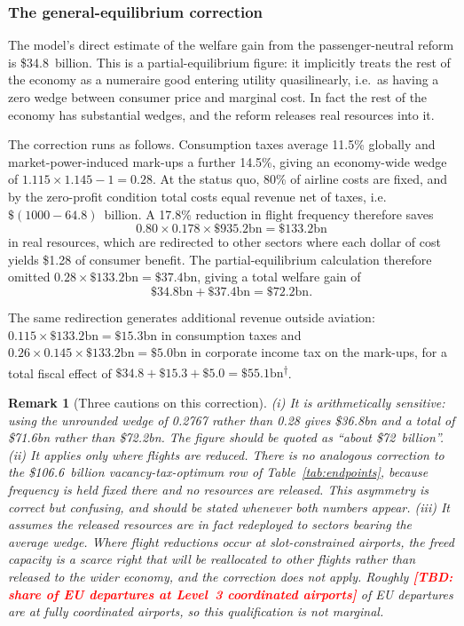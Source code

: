 \documentclass[11pt]{article}
\newtheorem{remark}{Remark}
\newcommand{\tbd}[1]{\textcolor{red}{\textbf{[TBD: #1]}}}
\newcommand{\derived}{\textsuperscript{$\dagger$}}
\begin{document}
\subsubsection{The general-equilibrium correction}
\label{subsec:ge}

The model's direct estimate of the welfare gain from the passenger-neutral
reform is \$34.8~billion. This is a partial-equilibrium figure: it implicitly
treats the rest of the economy as a numeraire good entering utility
quasilinearly, i.e.\ as having a zero wedge between consumer price and marginal
cost. In fact the rest of the economy has substantial wedges, and the reform
releases real resources into it.

The correction runs as follows. Consumption taxes average 11.5\% globally and
market-power-induced mark-ups a further 14.5\%, giving an economy-wide wedge of
$1.115 \times 1.145 - 1 = 0.28$. At the status quo, 80\% of airline costs are
fixed, and by the zero-profit condition total costs equal revenue net of taxes,
i.e.\ $\$(1000-64.8)$~billion. A 17.8\% reduction in flight frequency therefore
saves
\[
0.80 \times 0.178 \times \$935.2\text{bn} = \$133.2\text{bn}
\]
in real resources, which are redirected to other sectors where each dollar of
cost yields \$1.28 of consumer benefit. The partial-equilibrium calculation
therefore omitted $0.28 \times \$133.2\text{bn} = \$37.4\text{bn}$, giving a
total welfare gain of
\[
\$34.8\text{bn} + \$37.4\text{bn} = \$72.2\text{bn}.
\]

The same redirection generates additional revenue outside aviation:
$0.115 \times \$133.2\text{bn} = \$15.3\text{bn}$ in consumption taxes and
$0.26 \times 0.145 \times \$133.2\text{bn} = \$5.0\text{bn}$ in corporate income
tax on the mark-ups, for a total fiscal effect of
$\$34.8 + \$15.3 + \$5.0 = \$55.1\text{bn}$\derived{}.

\begin{remark}[Three cautions on this correction]
\emph{(i)} It is arithmetically sensitive: using the unrounded wedge of 0.2767
rather than 0.28 gives \$36.8bn and a total of \$71.6bn rather than \$72.2bn.
The figure should be quoted as ``about \$72~billion''.
\emph{(ii)} It applies only where flights are reduced. There is no analogous
correction to the \$106.6~billion vacancy-tax-optimum row of
Table~\ref{tab:endpoints}, because frequency is held fixed there and no
resources are released. This asymmetry is correct but confusing, and should be
stated whenever both numbers appear.
\emph{(iii)} It assumes the released resources are in fact redeployed to sectors
bearing the average wedge. Where flight reductions occur at slot-constrained
airports, the freed capacity is a scarce right that will be reallocated to other
flights rather than released to the wider economy, and the correction does not
apply. Roughly \tbd{share of EU departures at Level~3 coordinated airports}
of EU departures are at fully coordinated airports, so this qualification is not
marginal.
\end{remark}
\end{document}
